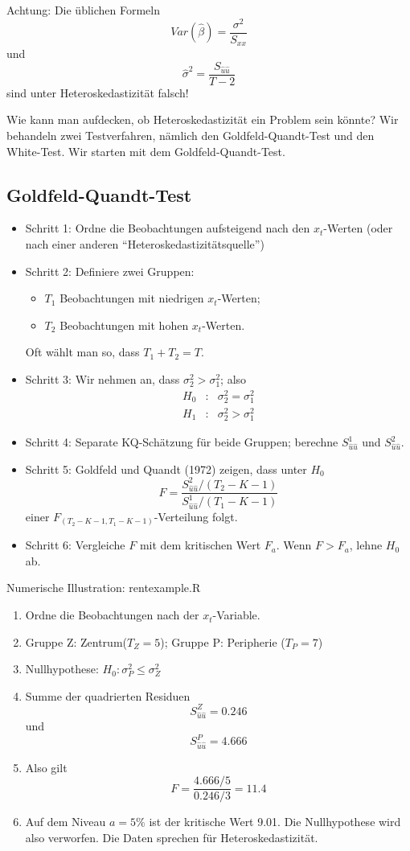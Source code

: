 \documentclass{article}
\begin{document}
Achtung: Die üblichen Formeln
\[ Var(\hat{\beta})=\frac{\sigma ^{2}}{S_{xx}} \]
und 
\[ \hat{\sigma}^{2}=\frac{S_{\hat{u}\hat{u}}}{T-2} \]
sind unter Heteroskedastizität falsch!

Wie kann man aufdecken, ob Heteroskedastizität ein Problem sein könnte?
Wir behandeln zwei Testverfahren, nämlich den Goldfeld-Quandt-Test und 
den White-Test. Wir starten mit dem Goldfeld-Quandt-Test.

\subsection*{Goldfeld-Quandt-Test}

\begin{itemize}
	\item Schritt 1: Ordne die Beobachtungen aufsteigend nach den $x_t$-Werten
	(oder nach einer anderen ``Heteroskedastizitätsquelle'')
	\item Schritt 2: Definiere zwei Gruppen:
	\begin{itemize}
		\item $T_{1}$ Beobachtungen mit niedrigen $x_{t}$-Werten;
		\item $T_{2}$ Beobachtungen mit hohen $x_{t}$-Werten.
	\end{itemize}
	Oft wählt man so, dass $T_{1}+T_{2}=T$.
	\item Schritt 3: Wir nehmen an, dass $\sigma _{2}^{2}>\sigma _{1}^{2}$; also
	\begin{eqnarray*}
		H_{0} &:&\sigma _{2}^{2}=\sigma _{1}^{2} \\
		H_{1} &:&\sigma _{2}^{2}>\sigma _{1}^{2}
	\end{eqnarray*}
	\item Schritt 4: Separate KQ-Schätzung für beide Gruppen; berechne $S_{\hat{u}\hat{u}}^{1}$
	und $S_{\hat{u}\hat{u}}^2$.
	\item Schritt 5: Goldfeld und Quandt (1972) zeigen, dass unter $H_{0}$ 
	\[ F=\frac{S_{\hat{u}\hat{u}}^2/(T_2-K-1)}{S_{\hat{u}\hat{u}}^1/(T_1-K-1)} \]
	einer $F_{(T_{2}-K-1,T_{1}-K-1)}$-Verteilung folgt.
	\item Schritt 6: Vergleiche $F$ mit dem kritischen Wert $F_a$. Wenn $F>F_{a}$,
	lehne $H_{0}$ ab.
\end{itemize}

Numerische Illustration: rentexample.R

\begin{enumerate}
	\item Ordne die Beobachtungen nach der $x_{t}$-Variable.
	\item Gruppe Z: Zentrum($T_Z=5$); Gruppe P: Peripherie ($T_P=7$)
	\item Nullhypothese: $H_{0}:\sigma _{P}^{2}\leq \sigma _{Z}^{2}$
	\item Summe der quadrierten Residuen
	\[ S_{\hat{u}\hat{u}}^{Z}=0.246 \]
	und 
	\[ S_{\hat{u}\hat{u}}^{P}=4.666 \]
	\item Also gilt
	\[ F=\frac{4.666/5}{0.246/3}=11.4 \]
	\item Auf dem Niveau $a=5\%$ ist der kritische Wert 9.01. Die Nullhypothese
	wird also verworfen. Die Daten sprechen für Heteroskedastizität.
\end{enumerate}
\end{document}
